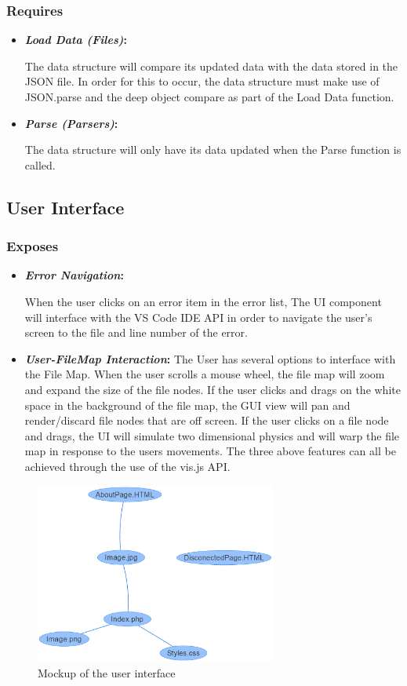 \documentclass[letterpaper,10pt,titlepage,draftclsnofoot,onecolumn,onesided] {IEEEtran}
\newcommand{\boldit}[2]{
	\textbf{\textit{#1}#2}
}
\begin{document}
\subsubsection{Requires}
\begin{itemize}
	\item \boldit{Load Data (Files)}{:} 
The data structure will compare its updated data with the data stored in the JSON file. 
In order for this to occur, the data structure must make use of JSON.parse and the deep object compare as part of the Load Data function. \cite{stringify}
	\item \boldit{Parse (Parsers)}{:} 
The data structure will only have its data updated when the Parse function is called.
\end{itemize}
	
\subsection{User Interface}
		
\subsubsection{Exposes}
\begin{itemize}
	\item \boldit{Error Navigation}{:} 
When the user clicks on an error item in the error list, The UI component will interface with the VS Code IDE API in order to navigate the user's screen to the file and line number of the error.
	\item \boldit{User-FileMap Interaction}{:} The User has several options to interface with the File Map. 
When the user scrolls a mouse wheel, the file map will zoom and expand the size of the file nodes.
If the user clicks and drags on the white space in the background of the file map, the GUI view will pan and render/discard file nodes that are off screen.
If the user clicks on a file node and drags, the UI will simulate two dimensional physics and will warp the file map in response to the users movements.
The three above features can all be achieved through the use of the vis.js API.
\end{itemize}
		
\begin{figure}
	\includegraphics[width=300px]{UIMockupEPS.eps}
	\caption{Mockup of the user interface}
\end{figure}
		
\end{document}
